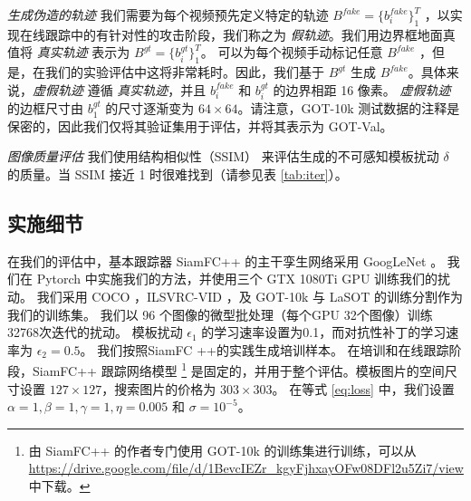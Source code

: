 \textit{生成伪造的轨迹} 我们需要为每个视频预先定义特定的轨迹 $B^{fake}=\{b^{fake}_i\}_1^{T}$ ，以实现在线跟踪中的有针对性的攻击阶段，我们称之为 \textit{假轨迹}。我们用边界框地面真值将 \textit{真实轨迹} 表示为 $B^{gt}=\{b^{gt}_i\}_1^T$。
可以为每个视频手动标记任意 $B^{fake}$ ，但是，在我们的实验评估中这将非常耗时。因此，我们基于 $B^{gt}$ 生成 $B^{fake}$。具体来说，\textit{虚假轨迹} 遵循 \textit{真实轨迹}，并且 $b^{fake}_i$ 和 $b^{gt}_i$ 的边界相距 16 像素。
\textit{虚假轨迹} 的边框尺寸由 $b^{gt}_1$ 的尺寸逐渐变为 $64\times 64$。请注意，GOT-10k 测试数据的注释是保密的，因此我们仅将其验证集用于评估，并将其表示为 GOT-Val。

\textit{图像质量评估} 我们使用结构相似性（SSIM）\cite{SSIM} 来评估生成的不可感知模板扰动 $\delta$ 的质量。当 SSIM 接近 1 时很难找到（请参见表 \ref{tab:iter}）。

\subsection{实施细节}

在我们的评估中，基本跟踪器 SiamFC++ \cite{SiamFC++} 的主干孪生网络采用 GoogLeNet \cite{GoogLeNet}。
我们在 Pytorch 中实施我们的方法，并使用三个 GTX 1080Ti GPU 训练我们的扰动。
我们采用 COCO \cite{COCO}，ILSVRC-VID \cite{VID}，及 GOT-10k \cite{GOT-10k} 与 LaSOT \cite{LaSOT} 的训练分割作为我们的训练集。
我们以 96 个图像的微型批处理（每个GPU 32个图像）训练32768次迭代的扰动。
模板扰动 $\epsilon_1$ 的学习速率设置为0.1，而对抗性补丁的学习速率为 $\epsilon_2 = 0.5$。
我们按照SiamFC ++的实践生成培训样本。
在培训和在线跟踪阶段，SiamFC++ 跟踪网络模型 \footnote{由 SiamFC++ 的作者专门使用 GOT-10k 的训练集进行训练，可以从 \url{https://drive.google.com/file/d/1BevcIEZr_kgyFjhxayOFw08DFl2u5Zi7/view} 中下载。} 是固定的，并用于整个评估。模板图片的空间尺寸设置 $127\times 127$，搜索图片的价格为 $303\times 303$。
在等式 \ref{eq:loss} 中，我们设置 $\alpha=1, \beta=1, \gamma=1, \eta=0.005$ 和 $\sigma=10^{-5}$。

